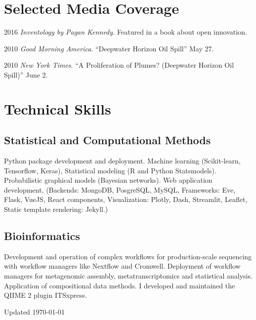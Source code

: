 \documentclass[12pt,letterpaper]{report}
\newcommand{\listitemspace}{0.15em}
\renewenvironment{itemize}
{\begin{list}{}{\setlength{\leftmargin}{0em}
            \setlength{\parskip}{0em}
            \setlength{\itemsep}{\listitemspace}
            \setlength{\parsep}{\listitemspace}}}
    {\end{list}}
\begin{document}
    \section*{Selected Media Coverage}

    \begin{tablist}
        \item[2016] \tab \textit{Inventology by Pagan Kennedy.} Featured in a book about open innovation.
        \item[2010] \tab \textit{Good Morning America}.  \enquote{Deepwater Horizon Oil Spill}  May 27.

        \item[2010] \tab \textit{New York Times}. \enquote{A Proliferation of Plumes? (Deepwater Horizon Oil Spill)}  June 2.
        


    \end{tablist}



    \section*{Technical Skills}

    \subsection*{Statistical and Computational Methods}

    \begin{itemize}

        \item Python package development and deployment. Machine learning (Scikit-learn, Tensorflow, Keras), Statistical modeling (R and Python Statsmodels). Probabilistic graphical models (Bayesian networks). Web application development, (Backends: MongoDB, PosgreSQL, MySQL, Frameworks: Eve, Flask, VueJS, React components, Visualization: Plotly, Dash, Streamlit, Leaflet, Static template rendering: Jekyll.)
        

    \end{itemize}

    \subsection*{Bioinformatics}

    \begin{itemize}

        \item Development and operation of complex workflows for production-scale sequencing with workflow managers like Nextflow and Cromwell. Deployment of workflow managers for metagenomic assembly, metatranscriptomics and statistical analysis. Application of compositional data methods. I developed and maintained the QIIME 2 plugin ITSxpress.

    \end{itemize}



    \begin{center}
        \vspace{6em}
        \vfill
        Updated \monthyeardate\today
    \end{center}
\end{document}
